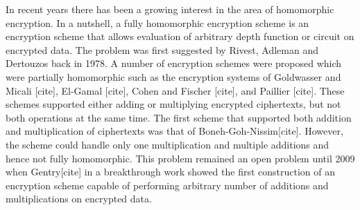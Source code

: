 \documentclass[10pt,journal,compsoc]{IEEEtran}
\theoremstyle{definition}
\begin{document}
\maketitle



\IEEEdisplaynontitleabstractindextext

\IEEEpeerreviewmaketitle






\IEEEPARstart
In recent years there has been a growing interest in the area of homomorphic encryption. In a nutshell, a fully homomorphic encryption scheme is an encryption scheme that allows evaluation of arbitrary depth function or circuit on encrypted data. The problem was first suggested by Rivest, Adleman and Dertouzos back in 1978. A number of encryption schemes were proposed which were partially homomorphic such as the encryption systems of Goldwasser and Micali [cite], El-Gamal [cite], Cohen and Fischer [cite], and Paillier [cite]. These schemes supported either adding or multiplying encrypted ciphertexts, but not both operations at the same time. The first scheme that supported both addition and multiplication of ciphertexts was that of Boneh-Goh-Nissim[cite]. However, the scheme could handle only one multiplication and multiple additions and hence not fully homomorphic. This problem remained an open problem until 2009 when Gentry[cite] in a breakthrough work showed the first construction of an encryption scheme capable of performing arbitrary number of additions and multiplications on encrypted data.
\end{document}
